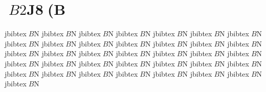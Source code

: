 \documentclass{jarticle}
\begin{document}
\section{$B2$J8(B}

jbibtex$B$N%
jbibtex$B$N%
jbibtex$B$N%
jbibtex$B$N%
jbibtex$B$N%
jbibtex$B$N%
jbibtex$B$N%
jbibtex$B$N%
jbibtex$B$N%
jbibtex$B$N%
jbibtex$B$N%
jbibtex$B$N%
jbibtex$B$N%
jbibtex$B$N%
jbibtex$B$N%
jbibtex$B$N%
jbibtex$B$N%
jbibtex$B$N%
jbibtex$B$N%
jbibtex$B$N%
jbibtex$B$N%
jbibtex$B$N%
jbibtex$B$N%
jbibtex$B$N%
jbibtex$B$N%
jbibtex$B$N%
jbibtex$B$N%
jbibtex$B$N%
jbibtex$B$N%
jbibtex$B$N%
jbibtex$B$N%
jbibtex$B$N%
jbibtex$B$N%
jbibtex$B$N%
jbibtex$B$N%
jbibtex$B$N%
\end{document}
